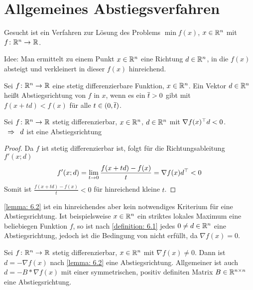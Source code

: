 \chapter{Allgemeines Abstiegsverfahren}

Gesucht ist ein Verfahren zur Lösung des Problems $\min f(x)$, $x \in \mathbb{R}^n$ mit $\abb{f}{\R^n}{\R}$.

Idee: Man ermittelt zu einem Punkt $x \in \mathbb{R}^n$ eine Richtung $d \in \mathbb{R}^n$, in die $f(x)$ absteigt und verkleinert in dieser $f(x)$ hinreichend.

\begin{definition}[Abstiegsrichtung] \label{definition: 6.1}
	Sei $\abb{f}{\R^n}{\R}$ eine stetig differenzierbare Funktion, $x \in \mathbb{R}^n$. Ein Vektor $d \in \mathbb{R}^n$ heißt Abstiegsrichtung von $f$ in $x$, wenn es ein $\overline{t} > 0$ gibt mit $f(x + td) < f(x)$ für alle $t \in (0,\overline{t})$.
\end{definition}

\begin{lemma} \label{lemma: 6.2}
	Sei $\abb{f}{\R^n}{\R}$ stetig differenzierbar, $x \in \mathbb{R}^n$, $d \in \mathbb{R}^n$ mit $\nabla f(x)^{\top} d < 0$. \\
	$\enskip \Rightarrow \enskip d$ ist eine Abstiegsrichtung
\end{lemma}
\begin{proof}
	Da $f$ ist stetig differenzierbar ist, folgt für die Richtungsableitung $f'(x;d)$
	\begin{equation*}
		f'(x;d) = \lim_{t \to 0} \frac{f(x + td)-f(x)}{t} = \nabla f(x) d^{\top} < 0
	\end{equation*}
	Somit ist $\frac{f(x+td)-f(x)}{t} <0$ für hinreichend kleine $t$.
\end{proof}

\begin{bemerkung}
	\cref{lemma: 6.2} ist ein hinreichendes aber kein notwendiges Kriterium für eine Abstiegsrichtung. Ist beispielsweise $x \in \mathbb{R}^n$ ein striktes lokales Maximum eine beliebiegen Funktion $f$, so ist nach \cref{definition: 6.1} jedes $0 \neq d \in \mathbb{R}^n$ eine Abstiegsrichtung, jedoch ist die Bedingung von  nicht erfüllt, da $\nabla f(x) = 0$.
\end{bemerkung}

\begin{beispiel}
	Sei $\abb{f}{\R^n}{\R}$ stetig differenzierbar, $x \in \mathbb{R}^n$ mit $\nabla f(x) \neq 0$. Dann ist $d = - \nabla f(x)$ nach \cref{lemma: 6.2} eine Abstiegsrichtung. Allgemeiner ist auch $d = - B * \nabla f(x)$ mit einer symmetrischen, positiv definiten Matrix $B \in \mathbb{R}^{n \times n}$ eine Abstiegsrichtung.
\end{beispiel}

